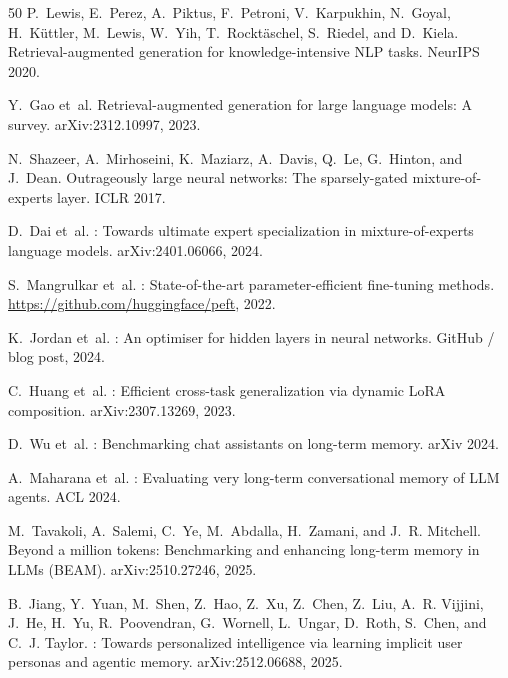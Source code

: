 \documentclass[11pt]{article}
\begin{document}
\begin{thebibliography}{50}
P.~Lewis, E.~Perez, A.~Piktus, F.~Petroni, V.~Karpukhin, N.~Goyal,
  H.~K\"uttler, M.~Lewis, W.~Yih, T.~Rockt\"aschel, S.~Riedel, and D.~Kiela.
\newblock Retrieval-augmented generation for knowledge-intensive {NLP} tasks.
\newblock NeurIPS 2020.

Y.~Gao et~al.
\newblock Retrieval-augmented generation for large language models: A survey.
\newblock arXiv:2312.10997, 2023.

N.~Shazeer, A.~Mirhoseini, K.~Maziarz, A.~Davis, Q.~Le, G.~Hinton, and J.~Dean.
\newblock Outrageously large neural networks: The sparsely-gated
  mixture-of-experts layer.
\newblock ICLR 2017.

D.~Dai et~al.
: Towards ultimate expert specialization in
  mixture-of-experts language models.
\newblock arXiv:2401.06066, 2024.

S.~Mangrulkar et~al.
: State-of-the-art parameter-efficient fine-tuning methods.
\newblock \url{https://github.com/huggingface/peft}, 2022.

K.~Jordan et~al.
: An optimiser for hidden layers in neural networks.
\newblock GitHub / blog post, 2024.

C.~Huang et~al.
: Efficient cross-task generalization via dynamic {LoRA}
  composition.
\newblock arXiv:2307.13269, 2023.

D.~Wu et~al.
: Benchmarking chat assistants on long-term memory.
\newblock arXiv 2024.

A.~Maharana et~al.
: Evaluating very long-term conversational memory of {LLM}
  agents.
\newblock ACL 2024.

M.~Tavakoli, A.~Salemi, C.~Ye, M.~Abdalla, H.~Zamani, and J.~R. Mitchell.
\newblock Beyond a million tokens: Benchmarking and enhancing long-term memory
  in {LLM}s ({BEAM}).
\newblock arXiv:2510.27246, 2025.

B.~Jiang, Y.~Yuan, M.~Shen, Z.~Hao, Z.~Xu, Z.~Chen, Z.~Liu, A.~R. Vijjini,
  J.~He, H.~Yu, R.~Poovendran, G.~Wornell, L.~Ungar, D.~Roth, S.~Chen, and
  C.~J. Taylor.
: Towards personalized intelligence via learning
  implicit user personas and agentic memory.
\newblock arXiv:2512.06688, 2025.


\end{thebibliography}
\end{document}
